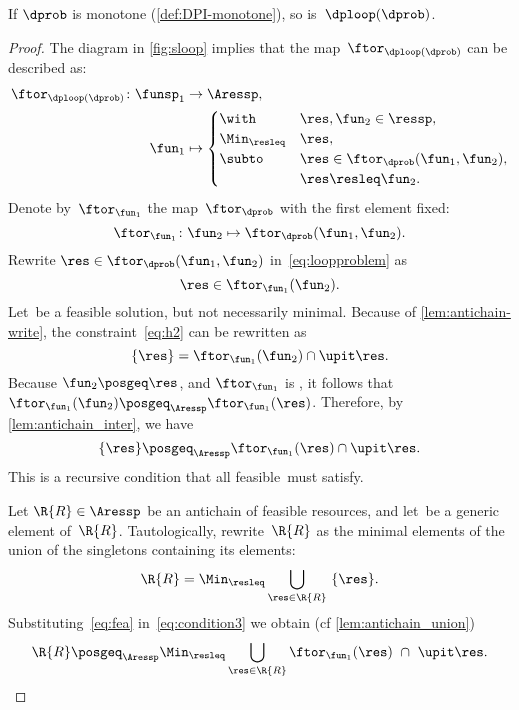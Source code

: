 \begin{proposition}
    \label{pro:loop-continuous}If $\dprob$ is monotone (\cref{def:DPI-monotone}),
    so is~$\dploop(\dprob)$.
\end{proposition}
\begin{proof}
    The diagram in \cref{fig:sloop} implies that the map~$\ftor_{\dploop(\dprob)}$
    can be described as:
    \begin{align}
        \ftor_{\dploop(\dprob)}\colon\funsp_{1} & \rightarrow\Aressp,\label{eq:loopproblem}\\
        \fun_{1} & \mapsto\begin{cases}
                              \with & \res,\fun_{2}\in\ressp,\\
                              \Min_{\resleq} & \res,\\
                              \subto & \res\in\ftor_{\dprob}(\fun_{1},\fun_{2}),\\
                              & \res\resleq\fun_{2}.
        \end{cases}
    \end{align}
    Denote by~$\ftor_{\fun_{1}}$ the map~$\ftor_{\dprob}$ with the
    first element fixed:
    \[
        \ftor_{\fun_{1}}\colon\fun_{2}\mapsto\ftor_{\dprob}(\fun_{1},\fun_{2}).
    \]
    Rewrite $\res\in\ftor_{\dprob}(\fun_{1},\fun_{2})$ in~\cref{eq:loopproblem}
    as
    \begin{equation}
        \res\in\ftor_{\fun_{1}}(\fun_{2}).\label{eq:h2}
    \end{equation}
    Let~\res be a feasible solution, but not necessarily minimal.
    Because of \cref{lem:antichain-write}, the constraint~\cref{eq:h2} can
    be rewritten as
    \begin{equation}
        \{\res\}=\ftor_{\fun_{1}}(\fun_{2})\cap\upit\res.\label{eq:h3}
    \end{equation}
    Because $\fun_{2}\posgeq\res$, and $\ftor_{\fun_{1}}$ is \scottcontinuous,
    it follows that~$\ftor_{\fun_{1}}(\fun_{2})\posgeq_{\Aressp}\ftor_{\fun_{1}}(\res)$.
    Therefore, by \cref{lem:antichain_inter}, we have
    \begin{equation}
        \{\res\}\posgeq_{\Aressp}\ftor_{\fun_{1}}(\res)\cap\upit\res.\label{eq:fea}
    \end{equation}
    This is a recursive condition that all feasible~\res must satisfy.

    Let $\R{R}\in\Aressp$ be an antichain of feasible resources, and
    let~\res be a generic element of~$\R{R}$. Tautologically, rewrite~$\R{R}$
    as the minimal elements of the union of the singletons containing
    its elements:
    \begin{equation}
        \R{R}=\Min_{\resleq}\bigcup_{\res\in\R{R}}\ \{\res\}.\label{eq:condition3}
    \end{equation}
    Substituting~\cref{eq:fea} in~\cref{eq:condition3} we obtain (cf
    \cref{lem:antichain_union})
    \begin{equation}
        \R{R}\posgeq_{\Aressp}\Min_{\resleq}\bigcup_{\res\in\R{R}}\ftor_{\fun_{1}}(\res)\ \cap\ \upit\res.\label{eq:recursive}
    \end{equation}


\end{proof}
